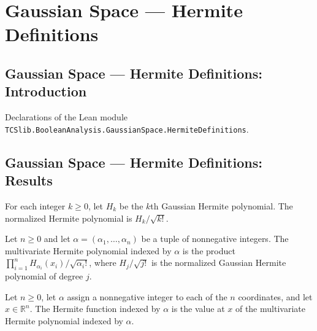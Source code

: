 \section{Gaussian Space --- Hermite Definitions}
\subsection*{Gaussian Space --- Hermite Definitions: Introduction}

Declarations of the Lean module \texttt{TCSlib.BooleanAnalysis.GaussianSpace.HermiteDefinitions}.

\subsection*{Gaussian Space --- Hermite Definitions: Results}

\begin{definition}
\label{BooleanAnalysis.GaussianSpace.normalizedHermitePolynomial}
\leanok
For each integer $k\ge 0$, let $H_k$ be the $k$th Gaussian Hermite polynomial. The
normalized Hermite polynomial is $H_k/\sqrt{k!}$.
\end{definition}

\begin{definition}
\label{BooleanAnalysis.GaussianSpace.multivariateHermitePolynomial}
\leanok
{}
Let $n\ge 0$ and let $\alpha=(\alpha_1,\ldots,\alpha_n)$ be a tuple of nonnegative
integers. The multivariate Hermite polynomial indexed by $\alpha$ is the product
$\prod_{i=1}^n H_{\alpha_i}(x_i)/\sqrt{\alpha_i!}$, where $H_j/\sqrt{j!}$ is the
normalized Gaussian Hermite polynomial of degree $j$.
\end{definition}

\begin{definition}
\label{BooleanAnalysis.GaussianSpace.hermiteFunction}
\leanok
{}
Let $n\ge 0$, let $\alpha$ assign a nonnegative integer to each of the $n$ coordinates,
and let $x\in\mathbb R^n$. The Hermite function indexed by $\alpha$ is the value at $x$
of the multivariate Hermite polynomial indexed by $\alpha$.
\end{definition}

